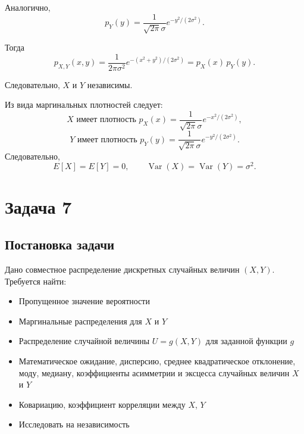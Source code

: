 \documentclass[a4paper,14pt]{extarticle}
\begin{document}
            Аналогично,
            \[
                p_Y(y) = \frac{1}{\sqrt{2\pi}\sigma} e^{-y^2/(2\sigma^2)}.
            \]
            
            Тогда
            \[
                p_{X,Y}(x,y)
                = \frac{1}{2\pi\sigma^2} e^{-(x^2+y^2)/(2\sigma^2)}
                = p_X(x) \, p_Y(y).
            \]
            
            Следовательно, $X$ и $Y$ независимы.
            
            Из вида маргинальных плотностей следует:
            \[
                X \text{ имеет плотность }
                p_X(x)=\frac{1}{\sqrt{2\pi}\sigma} e^{-x^2/(2\sigma^2)},\]
            \[
                Y \text{ имеет плотность }
                p_Y(y)=\frac{1}{\sqrt{2\pi}\sigma} e^{-y^2/(2\sigma^2)}.
            \]
            Следовательно,
            \[
                E[X] = E[Y] = 0, \qquad
                \operatorname{Var}(X) = \operatorname{Var}(Y) = \sigma^2.
            \]
            
            
    
    
    \section*{Задача 7}
        
        \subsection*{Постановка задачи}
            Дано совместное распределение дискретных случайных величин $(X, Y )$. Требуется найти:
            \begin{itemize}
                \item Пропущенное значение вероятности
                \item Маргинальные распределения для $X$ и $Y$
                \item Распределение случайной величины $U = g(X, Y)$ для заданной функции $g$
                \item Математическое ожидание, дисперсию, среднее квадратическое отклонение, моду, медиану, коэффициенты асимметрии и эксцесса случайных величин $X$ и $Y$
                \item Ковариацию, коэффициент корреляции между $X$, $Y$
                \item Исследовать на независимость
            \end{itemize}
        
\end{document}
